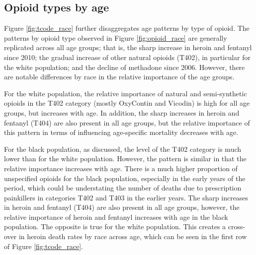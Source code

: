 \documentclass[12pt, a4paper]{article}
\begin{document}


\subsection{Opioid types by age}

Figure \ref{fig:tcode_race} further disaggregates age patterns by type of opioid. The patterns by opioid type observed in Figure \ref{fig:opioid_race} are generally replicated across all age groups; that is, the sharp increase in heroin and fentanyl since 2010; the gradual increase of other natural opioids (T402), in particular for the white population; and the decline of methadone since 2006. However, there are notable differences by race in the relative importance of the age groups. 

For the white population, the relative importance of natural and semi-synthetic opioids in the T402 category (mostly OxyContin and Vicodin) is high for all age groups, but increases with age. In addition, the sharp increases in heroin and fentanyl (T404) are also present in all age groups, but the relative importance of this pattern in terms of influencing age-specific mortality decreases with age.

For the black population, as discussed, the level of the T402 category is much lower than for the white population. However, the pattern is similar in that the relative importance increases with age. There is a much higher proportion of unspecified opioids for the black population, especially in the early years of the period, which could be understating the number of deaths due to prescription painkillers in categories T402 and T403 in the earlier years. The sharp increases in heroin and fentanyl (T404) are also present in all age groups, however, the relative importance of heroin and fentanyl increases with age in the black population. The opposite is true for the white population. This creates a cross-over in heroin death rates by race across age, which can be seen in the first row of Figure \ref{fig:tcode_race}.
\end{document}
